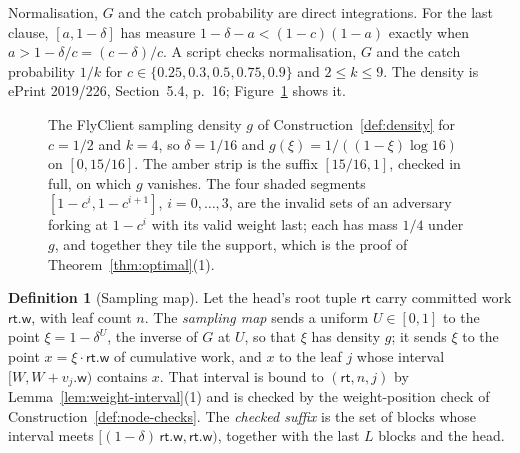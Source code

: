 \documentclass[11pt,a4paper]{article}
\theoremstyle{definition}
\newtheorem{definition}[theorem]{Definition}
\begin{document}
Normalisation, $G$ and the catch probability are direct integrations. For
the last clause, $[a,1-\delta]$ has measure $1-\delta-a<(1-c)(1-a)$ exactly
when $a>1-\delta/c=(c-\delta)/c$. A script checks
normalisation, $G$ and the catch probability $1/k$ for
$c\in\{0.25,0.3,0.5,0.75,0.9\}$ and $2\le k\le 9$. The density is ePrint
2019/226, Section~5.4, p.~16; Figure~\ref{fig:density} shows it.

\begin{figure}[t]
\centering
{}
\caption{The FlyClient sampling density $g$ of
Construction~\ref{def:density} for $c=1/2$ and $k=4$, so $\delta=1/16$ and
$g(\xi)=1/((1-\xi)\log 16)$ on $[0,15/16]$. The amber strip is the suffix
$[15/16,1]$, checked in full, on which $g$ vanishes. The four shaded
segments $[1-c^i,1-c^{i+1}]$, $i=0,\dots,3$, are the invalid sets of an
adversary forking at $1-c^i$ with its valid weight last; each has mass
$1/4$ under $g$, and together they tile the support, which is the proof of
Theorem~\ref{thm:optimal}(1).}
\label{fig:density}
\end{figure}

\begin{definition}[Sampling map]\label{def:sampling-map}
Let the head's root tuple $\mathsf{rt}$ carry committed work
$\mathsf{rt}.\mathsf{w}$, with leaf count $n$. The \emph{sampling map} sends
a uniform $U\in[0,1]$ to the point $\xi=1-\delta^U$, the inverse of $G$ at
$U$, so that $\xi$ has density $g$; it sends $\xi$ to the point
$x=\xi\cdot\mathsf{rt}.\mathsf{w}$ of cumulative work, and $x$ to the leaf
$j$ whose interval $[W,W+v_j.\mathsf{w})$ contains $x$. That interval is
bound to $(\mathsf{rt},n,j)$ by Lemma~\ref{lem:weight-interval}(1) and is
checked by the weight-position check of Construction~\ref{def:node-checks}.
The \emph{checked suffix} is the set of blocks whose interval meets
$[(1-\delta)\,\mathsf{rt}.\mathsf{w},\mathsf{rt}.\mathsf{w})$, together
with the last $L$ blocks and the head.
\end{definition}
\end{document}

